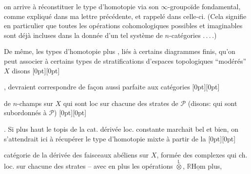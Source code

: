 %
on arrive à réconstituer le type d'homotopie via son $\infty$-groupoïde fondamental, comme expliqué dans ma lettre précédente, et rappelé dans celle-ci. (Cela signifie en particulier que toutes les opérations cohomologiques possibles et imaginables sont déjà incluses dans la donnée d'un tel système de $n$-catégories .\,.\,.\,.) 

De même, les types d'homotopie plus , liés à certains diagrammes finis, qu'on peut associer à certains types de stratifications  d'espaces topologiques ``modérés'' $X$ disons%
\raisebox{0pt}[0pt][0pt]{\parbox{0pt}{}}%
, devraient correspondre de façon aussi parfaite aux catégories%
\raisebox{0pt}[0pt][0pt]{\parbox{0pt}{}}
de $n$-champs sur $X$ qui sont loc  sur chacune des strates de $\mathcal P$ (disons: qui sont subordonnés à $\mathcal P$)%
\raisebox{0pt}[0pt][0pt]{\parbox{0pt}{}}.
Si plus haut le topis de la cat. dérivée loc. constante marchait bel et bien, on s'attendrait ici à récupérer le type d'homotopie mixte à partir de la %
\raisebox{0pt}[0pt][0pt]{\parbox{0pt}{}}catégorie de la  dérivée des faisceaux abéliens sur $X$, formée des complexes qui   ch. loc.  sur chacune des strates -- avec en plus les opérations $\overset{\mathbb{L}}{\otimes}$, $\mathbb{R}\underline{\mathrm{Hom}}$ plus, 
